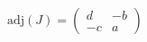 \documentclass[preview]{standalone}
\begin{document}
$\displaystyle
  \mathrm{adj}(J) = 
  \begin{pmatrix}
     d & -b \\
    -c & a 
  \end{pmatrix}
$
\end{document}
